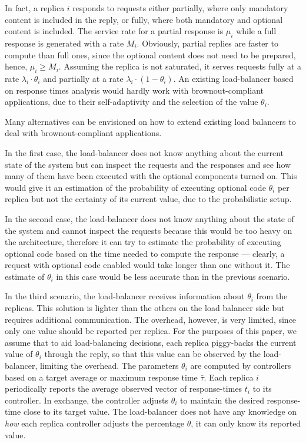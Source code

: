 In fact, a replica $i$ responds to requests either partially, where
only mandatory content is included in the reply, or fully, where both
mandatory and optional content is included. The service rate for a
partial response is $\mu_i$ while a full response is generated with a
rate $M_i$. Obviously, partial replies are faster to compute than full
ones, since the optional content does not need to be prepared, hence,
$\mu_i \geq M_i$. Assuming the replica is not saturated, it serves
requests fully at a rate $\lambda_i \cdot \theta_i$ and partially at a
rate $\lambda_i \cdot (1-\theta_i)$. An existing load-balancer based
on response times analysis would hardly work with brownout-compliant
applications, due to their self-adaptivity and the selection of the
value $\theta_i$.

Many alternatives can be envisioned on how to extend existing load
balancers to deal with brownout-compliant applications.

In the first case, the load-balancer does not know anything about the
current state of the system but can inspect the requests and the
responses and see how many of them have been executed with the
optional components turned on. This would give it an estimation of the
probability of executing optional code $\theta_i$ per replica but not
the certainty of its current value, due to the probabilistic setup.

In the second case, the load-balancer does not know anything about the
state of the system and cannot inspect the requests because this would
be too heavy on the architecture, therefore it can try to estimate the
probability of executing optional code based on the time needed to
compute the response --- clearly, a request with optional code enabled
would take longer than one without it. The estimate of $\theta_i$ in
this case would be less accurate than in the previous scenario.

In the third scenario, the load-balancer receives information about
$\theta_i$ from the replicas. This solution is lighter than the others
on the load balancer side but requires additional communication. The
overhead, however, is very limited, since only one value should be
reported per replica. For the purposes of this paper, we assume that
to aid load-balancing decisions, each replica piggy-backs the current
value of $\theta_i$ through the reply, so that this value can be
observed by the load-balancer, limiting the overhead. The parameters
$\theta_i$ are computed by controllers based on a target average or
maximum response time $\bar{\tau}$. Each replica $i$ periodically
reports the average observed vector of response-times $t_i$ to its
controller. In exchange, the controller adjusts $\theta_i$ to maintain
the desired response-time close to its target value. The load-balancer
does not have any knowledge on \emph{how} each replica controller
adjusts the percentage $\theta$, it can only know its reported value.

